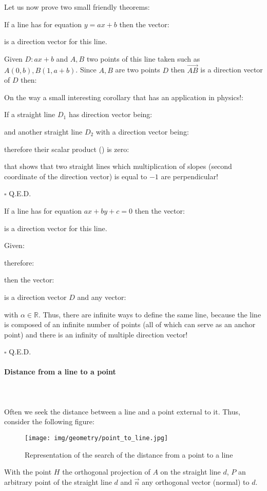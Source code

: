 	Let us now prove two small friendly theorems:
	\begin{theorem}
	If a line has for equation $y=ax+b$ then the vector:
	
	is a direction vector for this line.
	\end{theorem}
	\begin{dem}
	Given $D:ax+b$ and $A, B$ two points of this line taken such as ${A(0,b),B(1,a+b)}$. Since $A, B$ are two points $D$ then $\overrightarrow{AB}$ is a direction vector of $D$ then:
	
	On the way a small interesting corollary that has an application in physics!:
	
	If a straight line $D_1$ has direction vector being:
	
	and another straight line $D_2$ with a direction vector being:
	
	therefore their scalar product () is zero:
	
	that shows that two straight lines which multiplication of slopes (second coordinate of the direction vector) is equal to $-1$ are perpendicular!
	\begin{flushright}
		$\square$  Q.E.D.
	\end{flushright}
	\end{dem}
	\begin{theorem}
	If a line has for equation $ax+by+c=0$ then the vector:
	
	is a direction vector for this line.
	\end{theorem}
	\begin{dem}
	Given:
	
	therefore:
	
	then the vector:
	
	is a direction vector $D$ and any vector:
	
	with $\alpha\in \mathbb{R}$.
	Thus, there are infinite ways to define the same line, because the line is composed of an infinite number of points (all of which can serve as an anchor point) and there is an infinity of multiple direction vector!
	\begin{flushright}
		$\square$  Q.E.D.
	\end{flushright}
	\end{dem}
	
	\pagebreak
	\paragraph{Distance from a line to a point}\mbox{}\\\\
	Often we seek the distance between a line and a point external to it. Thus, consider the following figure:
	\begin{figure}[H]
		\centering
		\texttt{[image: img/geometry/point\_to\_line.jpg]}
		\caption{Representation of the search of the distance from a point to a line}
	\end{figure}
	With the point $H$ the orthogonal projection of $A$ on the straight line $d$, $P$ an arbitrary point of the straight line $d$ and $\vec{n}$ any orthogonal vector (normal) to $d$.
	
